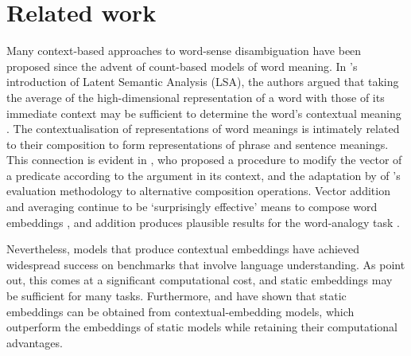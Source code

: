 \section{Related work}
\label{sec:related-work}

Many context-based approaches to word-sense disambiguation have been proposed since the
advent of count-based models of word meaning.
In \textcite{Landauer1997}'s introduction of Latent Semantic Analysis (LSA), the authors
argued that taking the average of the high-dimensional representation of a word with
those of its immediate context may be sufficient to determine the word's contextual
meaning \parencite*[229-230]{Landauer1997}.
The contextualisation of representations of word meanings is intimately related to their
composition to form representations of phrase and sentence meanings.
This connection is evident in \textcite{Kintsch2001}, who proposed a procedure to
modify the vector of a predicate according to the argument in its context, and
the adaptation by \textcite{Mitchell2008} of \citeauthor{Kintsch2001}'s evaluation
methodology to alternative composition operations.
Vector addition and averaging continue to be `surprisingly effective' means to
compose word embeddings \parencite[10]{Boleda2020}, and addition produces plausible
results for the word-analogy task \parencite[e.g.][]{Mikolov2013a}.

Nevertheless, models that produce contextual embeddings have achieved widespread
success on benchmarks that involve language understanding.
As \textcite{Arora2020} point out, this comes at a significant computational cost, and
static embeddings may be sufficient for many tasks.
Furthermore, \textcite{Gupta2019} and \textcite{Bommasani2020} have shown that
static embeddings can be obtained from contextual-embedding models, which outperform
the embeddings of static models while retaining their computational advantages.


